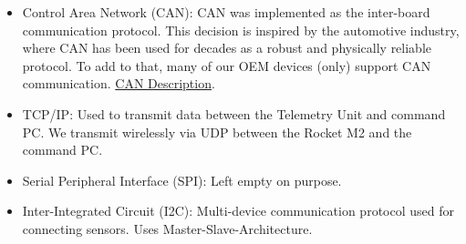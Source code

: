 \begin{itemize}
    \item Control Area Network (CAN): CAN was implemented as the inter-board communication protocol. This decision is inspired by the automotive industry, where CAN has been used for decades as a robust and physically reliable protocol.
    To add to that, many of our OEM devices (only) support CAN communication. \href{https://www.ti.com/lit/an/sloa101b/sloa101b.pdf}{CAN Description}.
    \item TCP/IP: Used to transmit data between the Telemetry Unit and command PC. We transmit wirelessly via UDP between the Rocket M2 and the command PC.
    
    \item Serial Peripheral Interface (SPI): Left empty on purpose.

    \item Inter-Integrated Circuit (I2C): Multi-device communication protocol used for connecting sensors. Uses Master-Slave-Architecture.
\end{itemize}

